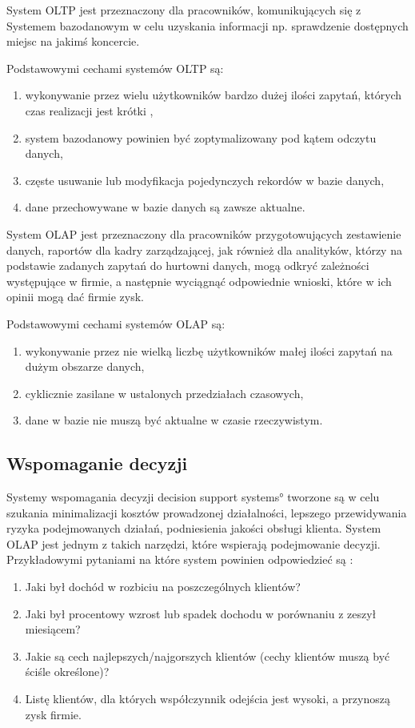 System OLTP jest przeznaczony dla pracowników, komunikujących się 
 z Systemem bazodanowym w celu uzyskania informacji 
 np. sprawdzenie dostępnych miejsc na jakimś koncercie.

Podstawowymi cechami systemów OLTP są:
\begin{enumerate}
 \item wykonywanie przez wielu użytkowników bardzo dużej ilości zapytań, których czas realizacji jest krótki \label{OLTP_1},
 \item system bazodanowy powinien być zoptymalizowany pod kątem odczytu danych,
 \item częste usuwanie lub modyfikacja pojedynczych rekordów w bazie danych,
 \item dane przechowywane w bazie danych są zawsze aktualne.
\end{enumerate}

System OLAP jest przeznaczony dla pracowników przygotowujących zestawienie danych,
 raportów dla kadry zarządzającej, jak również dla analityków, 
 którzy na podstawie zadanych zapytań do hurtowni danych,
 mogą odkryć zależności występujące w firmie, a następnie wyciągnąć odpowiednie wnioski,
 które w ich opinii mogą dać firmie zysk.
 
Podstawowymi cechami systemów OLAP są:
\begin{enumerate}
 \item wykonywanie przez nie wielką liczbę użytkowników małej ilości zapytań na dużym obszarze danych,
 \item cyklicznie zasilane w ustalonych przedziałach czasowych,
 \item dane w bazie nie muszą być aktualne w czasie rzeczywistym.
\end{enumerate}


\subsection{Wspomaganie decyzji }
Systemy wspomagania decyzji \ang{decision support systems} tworzone są 
 w celu szukania minimalizacji kosztów prowadzonej działalności,
 lepszego przewidywania ryzyka podejmowanych działań, podniesienia jakości obsługi klienta. System OLAP jest 
 jednym z takich narzędzi, które wspierają podejmowanie decyzji.
Przykładowymi pytaniami na które system powinien odpowiedzieć są\cite{TodMan} :
 \begin{enumerate}
  \item Jaki był dochód w rozbiciu na poszczególnych klientów?
  \item Jaki był procentowy wzrost lub spadek dochodu w porównaniu z zeszył miesiącem?
  \item Jakie są cech najlepszych/najgorszych klientów (cechy klientów muszą być ściśle określone)?
  \item Listę klientów, dla których współczynnik odejścia jest wysoki, a przynoszą zysk firmie.
 
 \end{enumerate}

